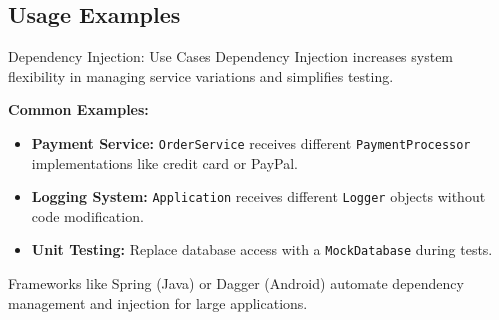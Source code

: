 \documentclass[aspectratio=169, table]{beamer}
\begin{document}
\subsection{Usage Examples}
\begin{frame}[fragile]{Dependency Injection: Use Cases}
	\vspace{20pt}
	Dependency Injection increases system flexibility in managing service variations and simplifies testing.
	
	\vspace{10pt}
	\textbf{Common Examples:}
	\begin{itemize}
		\item \textbf{Payment Service:} \texttt{OrderService} receives different \texttt{PaymentProcessor} implementations like credit card or PayPal.
		\item \textbf{Logging System:} \texttt{Application} receives different \texttt{Logger} objects without code modification.
		\item \textbf{Unit Testing:} Replace database access with a \texttt{MockDatabase} during tests.
	\end{itemize}
	
	Frameworks like Spring (Java) or Dagger (Android) automate dependency management and injection for large applications.
\end{frame}
\end{document}
